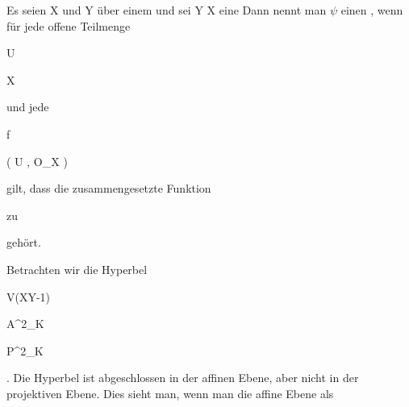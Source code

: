 {


Es seien
\mathkor {} {X} {und} {Y} {}
über einem
und sei
\maabbdisp {{\psi}} {Y } { X
} {}
eine
Dann nennt man ${\psi}$ einen 
 {} {,}
wenn für jede offene Teilmenge


\mavergleichskette

{\vergleichskette

{ U
}

{ \subseteq }{ X
}

{  }{
}

{    }{
}

{   }{
}

}
{}{}{}
und jede


\mavergleichskette

{\vergleichskette

{f
}

{ \in }{ \Gamma ( U , {\mathcal O}_X )
}

{  }{
}

{    }{
}

{   }{
}

}
{}{}{}
gilt, dass die zusammengesetzte Funktion


 {  }


zu

 gehört.


}




Betrachten wir die Hyperbel


\mavergleichskette

{\vergleichskette

{ V(XY-1)
}

{ \subset }{ {\mathbb A}^{2}_{K}
}

{ \subset }{ {\mathbb P}^{2}_{K}
}

{    }{
}

{   }{
}

}
{}{}{.}
Die Hyperbel ist abgeschlossen in der affinen Ebene, aber nicht in der projektiven Ebene. Dies sieht man, wenn man die affine Ebene als


